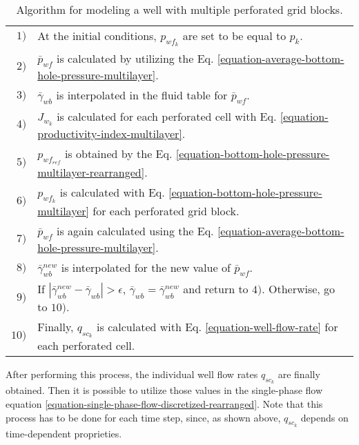 \begin{table}[htbp]
	\centering
	\caption{Algorithm for modeling a well with multiple perforated grid blocks.}
	\begin{tabular}{r l}
		\toprule
		$1)$ & At the initial conditions, $p_{wf_{k}}$ are set to be equal to $p_k$. \\
		$2)$ & $\bar{p}_{wf}$ is calculated by utilizing the Eq. \ref{equation-average-bottom-hole-pressure-multilayer}. \\
		$3)$ & $\bar{\gamma}_{wb}$ is interpolated in the fluid table for $\bar{p}_{wf}$.\\
		$4)$ & $J_{w_k}$ is calculated for each perforated cell with Eq. \ref{equation-productivity-index-multilayer}.\\
		$5)$ & $p_{wf_{ref}}$ is obtained by the Eq. \ref{equation-bottom-hole-pressure-multilayer-rearranged}.\\
		$6)$ & $p_{wf_{k}}$ is calculated with Eq. \ref{equation-bottom-hole-pressure-multilayer} for each perforated grid block.\\
		$7)$ & $\bar{p}_{wf}$ is again calculated using the Eq. \ref{equation-average-bottom-hole-pressure-multilayer}. \\
		$8)$ & $\bar{\gamma}_{wb}^{new}$ is interpolated for the new value of $\bar{p}_{wf}$.\\
		$9)$ & If $|\bar{\gamma}_{wb}^{new} - \bar{\gamma}_{wb}| > \epsilon$, $\bar{\gamma}_{wb} = \bar{\gamma}_{wb}^{new}$ and return to $4)$. Otherwise, go to $10)$.\\
		$10)$ & Finally, $q_{{sc}_k}$ is calculated with Eq. \ref{equation-well-flow-rate} for each perforated cell.\\
		\bottomrule
	\end{tabular}
	\label{table-multilayer-well-model-algorithm}
\end{table}
%
After performing this process, the individual well flow rates $q_{sc_k}$ are finally obtained.
%
Then it is possible to utilize those values in the single-phase flow equation \ref{equation-single-phase-flow-discretized-rearranged}.
%
Note that this process has to be done for each time step, since, as shown above, $q_{sc_k}$ depends on time-dependent proprieties.


